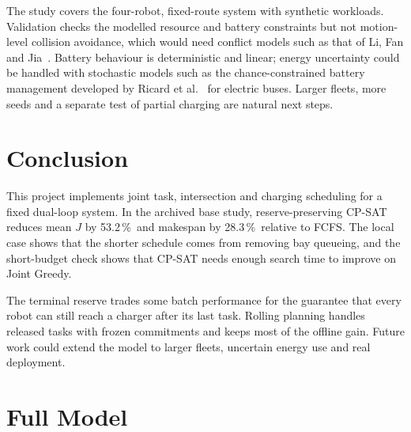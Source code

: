 \documentclass[11pt,a4paper]{article}
\newcommand{\pct}{\,\%}
\begin{document}
The study covers the four-robot, fixed-route system with synthetic workloads. Validation checks the
modelled resource and battery constraints but not motion-level collision avoidance, which would need
conflict models such as that of Li, Fan and Jia~\cite{li2024conflict}. Battery behaviour is
deterministic and linear; energy uncertainty could be handled with stochastic models such as the
chance-constrained battery management developed by Ricard et al.~\cite{ricard2026chance} for electric
buses. Larger fleets, more seeds and a separate test of partial charging are natural next steps.

\section{Conclusion}
\label{sec:conclusion}

This project implements joint task, intersection and charging scheduling for a fixed dual-loop system.
In the archived base study, reserve-preserving CP-SAT reduces mean $J$ by 53.2\pct\ and makespan by
28.3\pct\ relative to FCFS. The local case shows that the shorter schedule comes from removing bay queueing, and the short-budget
check shows that CP-SAT needs enough search time to improve on Joint Greedy.

The terminal reserve trades some batch performance for the guarantee that every robot can still reach
a charger after its last task. Rolling planning handles released tasks with frozen commitments and keeps
most of the offline gain. Future work could extend the model to larger fleets, uncertain energy use and
real deployment.



\appendix
\section{Full Model}
\label{app:model}
\end{document}
